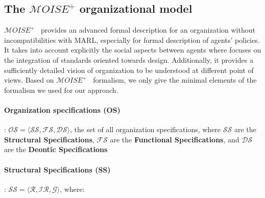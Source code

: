 \documentclass[pdflatex,sn-mathphys-num]{sn-jnl}%
\theoremstyle{thmstyleone}%
\theoremstyle{thmstyletwo}%
\theoremstyle{thmstylethree}%
\begin{document}

\subsection{The $\mathcal{M}OISE^+$ organizational model}

%     


$\mathcal{M}OISE^+$~\citep{Hubner2002} provides an advanced formal description for an organization without incompatibilities with MARL, especially for formal description of agents' policies. It takes into account explicitly the social aspects between agents where  focuses on the integration of standards oriented towards design. Additionally, it provides a sufficiently detailed vision of organization to be understood at different point of views.
Based on $\mathcal{M}OISE^+$~\citep{Hubner2007} formalism, we only give the minimal elements of the formalism we used for our approach.

\paragraph{\textbf{Organization specifications (OS)}}: $\mathcal{OS} = \langle \mathcal{SS}, \mathcal{FS}, \mathcal{DS} \rangle$, the set of all organization specifications, where $\mathcal{SS}$ are the \textbf{Structural Specifications}, $\mathcal{FS}$ are the \textbf{Functional Specifications}, and $\mathcal{DS}$ are the \textbf{Deontic Specifications}

\paragraph{\textbf{Structural Specifications (SS)}}: $\mathcal{SS} = \langle \mathcal{R}, \mathcal{IR}, \mathcal{G} \rangle$, where:
\end{document}
